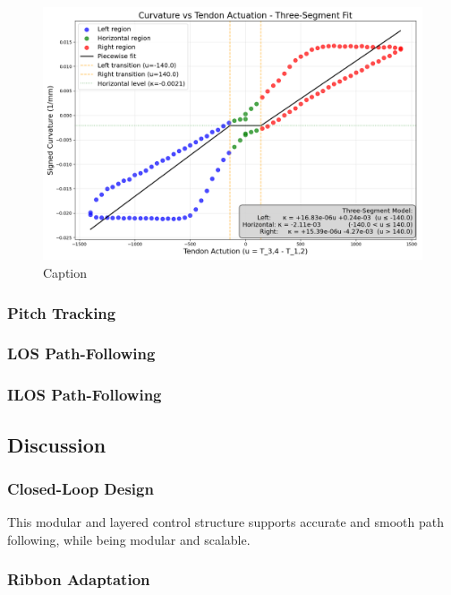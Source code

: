 \begin{figure} [H]
    \centering
    \includegraphics[width=0.9\linewidth]{images/ribbonadapter/ribbonfit_2025-06-30_15-59-06.png}
    \caption{Caption}
    \label{fig:enter-label}
\end{figure}



\subsubsection{Pitch Tracking}

\subsubsection{LOS Path-Following}

\subsubsection{ILOS Path-Following}


\subsection{Discussion}

\subsubsection{Closed-Loop Design}
This modular and layered control structure supports accurate and smooth path following, while being modular and scalable. 

\subsubsection{Ribbon Adaptation}


